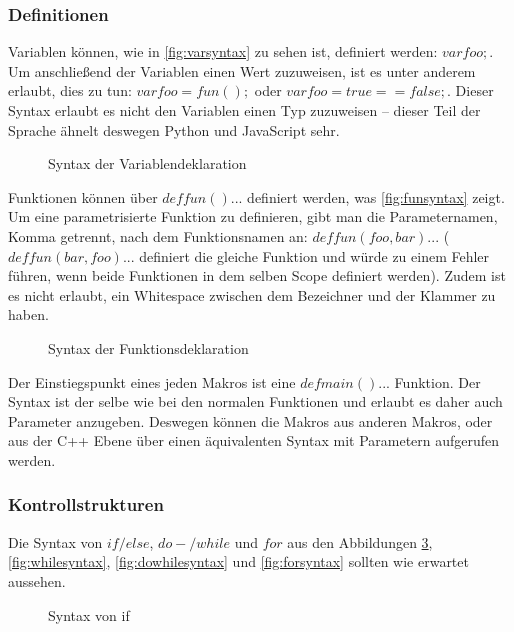 {    %
    \subsubsection{Definitionen}
    \label{sssec:Definitionen}
      Variablen können, wie in \autoref{fig:varsyntax} zu sehen ist, definiert werden: \myMIn$var foo;$. Um anschließend der Variablen einen Wert zuzuweisen, ist es unter anderem erlaubt, dies zu tun: \myMIn$var foo = fun();$ oder \myMIn$var foo = true == false;$. Dieser Syntax erlaubt es nicht den Variablen einen Typ zuzuweisen -- dieser Teil der Sprache ähnelt deswegen Python und JavaScript sehr.
      \begin{figure}[H]
        \centering
        \caption{Syntax der Variablendeklaration}
        \label{fig:varsyntax}
      \end{figure}

      Funktionen können über \myMIn$def fun(){...}$ definiert werden, was \autoref{fig:funsyntax} zeigt. Um eine parametrisierte Funktion zu definieren, gibt man die Parameternamen, Komma getrennt, nach dem Funktionsnamen an: \myMIn$def fun(foo, bar){...}$ (\myMIn$def fun(bar, foo){...}$ definiert die gleiche Funktion und würde zu einem Fehler führen, wenn beide Funktionen in dem selben Scope definiert werden). Zudem ist es nicht erlaubt, ein Whitespace zwischen dem Bezeichner und der Klammer zu haben.
      \begin{figure}[H]
        \centering
        \caption{Syntax der Funktionsdeklaration}
        \label{fig:funsyntax}
      \end{figure}
      Der Einstiegspunkt eines jeden Makros ist eine \myMIn$def main(){...}$ Funktion. Der Syntax ist der selbe wie bei den normalen Funktionen und erlaubt es daher auch Parameter anzugeben. Deswegen können die Makros aus anderen Makros, oder aus der C++ Ebene über einen äquivalenten Syntax mit Parametern aufgerufen werden.

    \subsubsection{Kontrollstrukturen}
    \label{sssec:Kontrollstrukturen}
      Die Syntax von \myMIn$if/else$, \myMIn$do-/while$ und \myMIn$for$ aus den Abbildungen \ref{fig:ifsyntax}, \ref{fig:whilesyntax}, \ref{fig:dowhilesyntax} und \ref{fig:forsyntax} sollten wie erwartet aussehen.
      \begin{figure}[H]
        \centering
        \caption{Syntax von if}
        \label{fig:ifsyntax}
      \end{figure}

}
